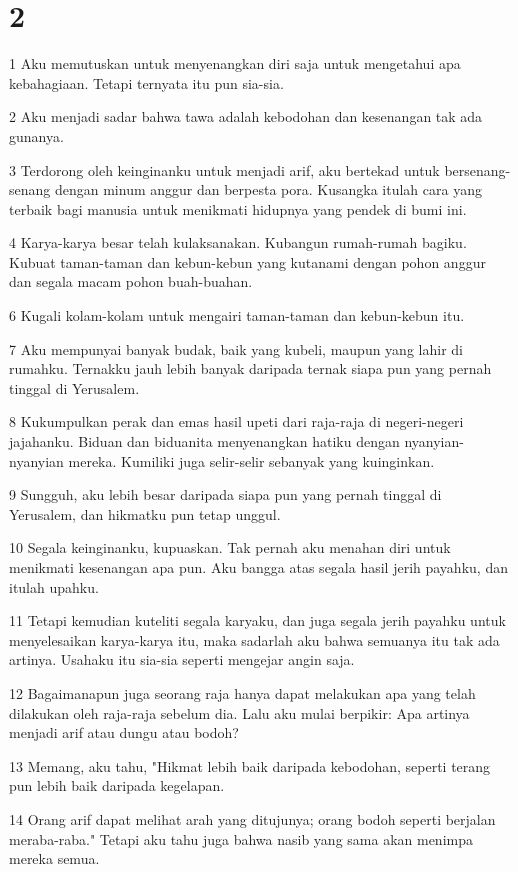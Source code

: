 \chapter{2}

\par 1 Aku memutuskan untuk menyenangkan diri saja untuk mengetahui apa kebahagiaan. Tetapi ternyata itu pun sia-sia.
\par 2 Aku menjadi sadar bahwa tawa adalah kebodohan dan kesenangan tak ada gunanya.
\par 3 Terdorong oleh keinginanku untuk menjadi arif, aku bertekad untuk bersenang-senang dengan minum anggur dan berpesta pora. Kusangka itulah cara yang terbaik bagi manusia untuk menikmati hidupnya yang pendek di bumi ini.
\par 4 Karya-karya besar telah kulaksanakan. Kubangun rumah-rumah bagiku. Kubuat taman-taman dan kebun-kebun yang kutanami dengan pohon anggur dan segala macam pohon buah-buahan.
\par 6 Kugali kolam-kolam untuk mengairi taman-taman dan kebun-kebun itu.
\par 7 Aku mempunyai banyak budak, baik yang kubeli, maupun yang lahir di rumahku. Ternakku jauh lebih banyak daripada ternak siapa pun yang pernah tinggal di Yerusalem.
\par 8 Kukumpulkan perak dan emas hasil upeti dari raja-raja di negeri-negeri jajahanku. Biduan dan biduanita menyenangkan hatiku dengan nyanyian-nyanyian mereka. Kumiliki juga selir-selir sebanyak yang kuinginkan.
\par 9 Sungguh, aku lebih besar daripada siapa pun yang pernah tinggal di Yerusalem, dan hikmatku pun tetap unggul.
\par 10 Segala keinginanku, kupuaskan. Tak pernah aku menahan diri untuk menikmati kesenangan apa pun. Aku bangga atas segala hasil jerih payahku, dan itulah upahku.
\par 11 Tetapi kemudian kuteliti segala karyaku, dan juga segala jerih payahku untuk menyelesaikan karya-karya itu, maka sadarlah aku bahwa semuanya itu tak ada artinya. Usahaku itu sia-sia seperti mengejar angin saja.
\par 12 Bagaimanapun juga seorang raja hanya dapat melakukan apa yang telah dilakukan oleh raja-raja sebelum dia. Lalu aku mulai berpikir: Apa artinya menjadi arif atau dungu atau bodoh?
\par 13 Memang, aku tahu, "Hikmat lebih baik daripada kebodohan, seperti terang pun lebih baik daripada kegelapan.
\par 14 Orang arif dapat melihat arah yang ditujunya; orang bodoh seperti berjalan meraba-raba." Tetapi aku tahu juga bahwa nasib yang sama akan menimpa mereka semua.
